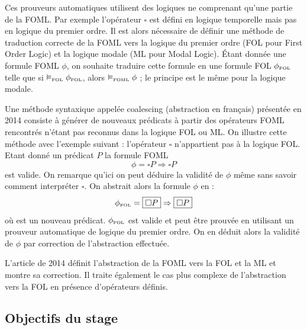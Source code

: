 \documentclass[12pt]{article}
\newcommand{\FOL}{\ensuremath{\textup{\tiny{}FOL}}}
\newcommand{\FOML}{\ensuremath{\textup{\tiny{}FOML}}}
\newcommand{\raph}[1]{\textcolor{red}{#1}}
\newcommand{\bpar}[1]{\marginpar{\color{myblue}\footnotesize\raggedright#1}}
\begin{document}
Ces prouveurs automatiques utilisent des logiques ne comprenant qu'une partie de la FOML.
Par exemple l'opérateur $\square$ est défini en logique temporelle mais pas en logique du premier ordre.
Il est alors nécessaire de définir une méthode de traduction correcte de la FOML vers la logique du premier ordre (FOL pour First Order Logic) et la logique modale (ML pour Modal Logic).
Étant donnée une formule FOML $\phi$, on souhaite traduire cette formule en une formule FOL $\phi_\FOL$ telle que si $\vDash_\FOL \phi_\FOL$, alors $\vDash_\FOML \phi$ ; le principe est le même pour la logique modale.

Une méthode syntaxique appelée \og{}coalescing\fg{} (\og{}abstraction\fg{} en français) présentée en 2014 \cite{ARQNL2014} consiste à générer de nouveaux prédicats à partir des opérateurs FOML rencontrés n'étant pas reconnus dans la logique FOL ou ML.
On illustre cette méthode avec l'exemple suivant : l'opérateur $\square$ n'appartient pas à la logique FOL.
Etant donné un prédicat $P$ la formule FOML
\[ \phi = \square P \Rightarrow \square P \]
est valide.
On remarque qu'ici on peut déduire la validité de $\phi$ même sans savoir comment interpréter $\square$.
On abstrait alors la formule $\phi$ en :
\[ \phi_\FOL = \fbox{$\square P$} \Rightarrow \fbox{$\square P$} \]
où  est un nouveau prédicat.
$\phi_\FOL$ est valide et peut être prouvée en utilisant un prouveur automatique de logique du premier ordre.
On en déduit alors la validité de $\phi$ par correction de l'abstraction effectuée.

L'article de 2014 \cite{ARQNL2014} définit l'abstraction de la FOML vers la FOL et la ML et montre sa correction.
Il traite également le cas plus complexe de l'abstraction vers la FOL en présence d'opérateurs définis.

\subsection{Objectifs du stage}
\end{document}
